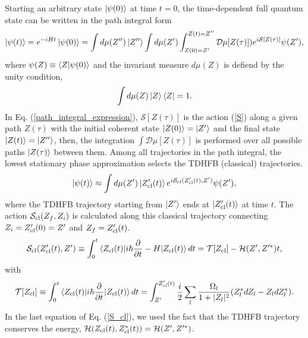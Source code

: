 \documentclass[%
superscriptaddress,
preprint,
showpacs,
nofootinbib,
amsmath,amssymb,
prc,
floatfix ]%
{revtex4-1}
\begin{document}
Starting an arbitrary state $\ket{\psi(0)}$ at time $t=0$,
the time-dependent full quantum state can be written in the path integral form
\begin{equation}
\ket{\psi(t)}
	= e^{-iHt} \ket{\psi(0)}
	= \int d\mu(Z'') \ket{Z''} \int d\mu(Z')
	\int_{Z(0)=Z'}^{Z(t)=Z''} \mathcal{D}\mu[Z(\tau)])
	e^{i\mathcal{S}[Z(\tau)]} \psi(Z') ,
\label{path_integral_expression}
\end{equation}
where $\psi(Z)\equiv \braket{Z|\psi(0)}$ and
the invariant measure $d\mu(Z)$ is defiend by 
the unity condition,
\begin{equation}
  \int d\mu(Z) \ket{Z}\bra{Z} = 1 .
  \label{unity}
\end{equation}
In Eq. (\ref{path_integral_expression}),
$\mathcal{S}[Z(\tau)]$ is the action (\ref{S}) along a given path $Z(\tau)$
with the initial coherent state $\ket{Z(0)}=\ket{Z'}$ and
the final state $\ket{Z(t)}=\ket{Z''}$,
then, the integration $\int \mathcal {D}\mu[Z(\tau)]$
is performed over all possible paths $\ket{Z(\tau)}$ between them.
Among all trajectories in the path integral,
the lowest stationary phase approximation selects
the TDHFB (classical) trajectories.
\begin{equation}
	\ket{\psi(t)} \approx \int d\mu(Z') \ket{Z'_{\rm cl}(t)}
	e^{i\mathcal{S}_{\rm cl}(Z'_{\rm cl}(t),Z')} \psi(Z') ,
	\label{SPA}
\end{equation}
where the TDHFB trajectory starting from $\ket{Z'}$
ends at $\ket{Z'_{\rm cl}(t)}$ at time $t$.
The action $\mathcal{S}_{\rm cl}(Z_f,Z_i)$ is calculated along this
classical trajectory
connecting $Z_i=Z'_{\rm cl}(0)=Z'$ and $Z_f=Z'_{\rm cl}(t)$.
\begin{equation}
	\mathcal{S}_{\rm cl}(Z'_{\rm cl}(t),Z') \equiv \int_{0}^{t}
\braket{Z_{\rm cl}(t)|
	i\hbar\frac{\partial}{\partial t} - H
	|Z_{\rm cl}(t)} dt
	= \mathcal{T}[Z_{\rm cl}] - \mathcal{H}(Z',Z'^*) t 
	,
	\label{S_cl}
\end{equation}
with
\begin{equation}
\mathcal{T}[Z_{\rm cl}]\equiv
\int_{0}^{t} \braket{Z_{\rm cl}(t)| i\hbar\frac{\partial}{\partial t}
	|Z_{\rm cl}(t)} dt 
	= \int_{Z'}^{Z'_{\rm cl}(t)}
	\frac{i}{2} \sum_l \frac{\Omega_l}{1+|Z_l|^2}
  (Z_l^* dZ_l - Z_l dZ_l^*) .
\end{equation}
In the last equation of Eq. (\ref{S_cl}),
we used the fact that the TDHFB trajectory conserves the energy,
$\mathcal{H}(Z_{\rm cl}(t),Z_{\rm cl}^*(t))= \mathcal{H}(Z',Z'^*)$.
\end{document}
